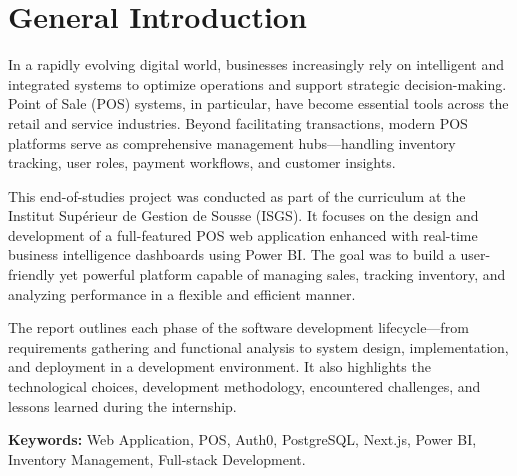 \chapter*{General Introduction}

In a rapidly evolving digital world, businesses increasingly rely on intelligent and integrated systems to optimize operations and support strategic decision-making. Point of Sale (POS) systems, in particular, have become essential tools across the retail and service industries. Beyond facilitating transactions, modern POS platforms serve as comprehensive management hubs—handling inventory tracking, user roles, payment workflows, and customer insights.

This end-of-studies project was conducted as part of the curriculum at the Institut Supérieur de Gestion de Sousse (ISGS). It focuses on the design and development of a full-featured POS web application enhanced with real-time business intelligence dashboards using Power BI. The goal was to build a user-friendly yet powerful platform capable of managing sales, tracking inventory, and analyzing performance in a flexible and efficient manner.

The report outlines each phase of the software development lifecycle—from requirements gathering and functional analysis to system design, implementation, and deployment in a development environment. It also highlights the technological choices, development methodology, encountered challenges, and lessons learned during the internship.

\vspace{0.5cm}
\textbf{Keywords:} Web Application, POS, Auth0, PostgreSQL, Next.js, Power BI, Inventory Management, Full-stack Development.
